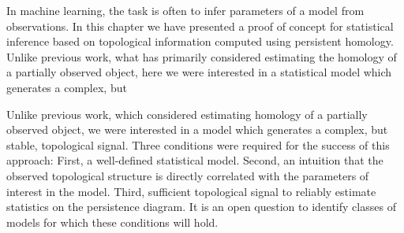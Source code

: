 In machine learning, the task is often to infer parameters of a model from observations.
In this chapter we have presented a proof of concept for statistical inference based on topological information computed using persistent homology.
Unlike previous work, what has primarily considered estimating the homology of a partially observed object, here we were interested in a statistical model which generates a complex, but 


Unlike previous work, which considered estimating homology of a partially observed object, we were interested in a model which generates a complex, but stable, topological signal.
Three conditions were required for the success of this approach:
First, a well-defined statistical model.
Second, an intuition that the observed topological structure is directly correlated with the parameters of interest in the model.
Third, sufficient topological signal to reliably estimate statistics on the persistence diagram.
It is an open question to identify classes of models for which these conditions will hold.
